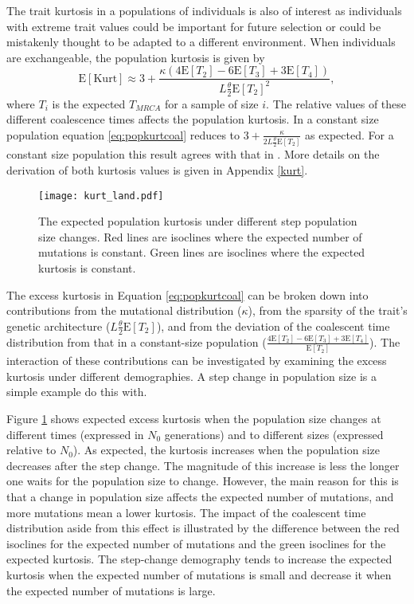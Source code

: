 \documentclass{article}
\newcommand{\T}{\frac{\theta}{2}}
\newcommand{\E}{\mathrm{E}}
\begin{document}
The trait kurtosis in a populations of individuals is also of interest as
individuals with extreme trait values could be important for future selection or
could be mistakenly thought to be adapted to a different environment. When
individuals are exchangeable, the population kurtosis is given by
\begin{equation}
  \label{eq:popkurtcoal}
  \E[\mbox{Kurt}] \approx 3 + \frac{\kappa( 4\E[T_2] - 6\E[T_3] + 
    3\E[T_4])}{L \T \E[T_2]^2},
\end{equation}
where $T_i$ is the expected $T_{MRCA}$ for a sample of size $i$. The relative
values of these different coalescence times affects the population kurtosis. In
a constant size population equation \eqref{eq:popkurtcoal} reduces to $3 +
\frac{\kappa}{2L\T \E[T_2]}$ as expected. For a constant size population this
result agrees with that in \citet{Schraiber2015}. More details on the derivation
of both kurtosis values is given in Appendix \ref{kurt}.

\begin{figure}
  \centering
  \texttt{[image: kurt\_land.pdf]}
  \caption{\footnotesize The expected population kurtosis under different step
    population size changes. Red lines are isoclines where the expected number
    of mutations is constant. Green lines are isoclines where the expected
    kurtosis is constant.}
  \label{fig:kurtscape}
\end{figure}

The excess kurtosis in Equation \ref{eq:popkurtcoal} can be broken down into
contributions from the mutational distribution ($\kappa$), from the sparsity of
the trait's genetic architecture ($L \T \E[T_2]$), and from the deviation of
the coalescent time distribution from that in a constant-size population
($\frac{ 4\E[T_2] - 6\E[T_3] + 3\E[T_4] }{ \E[T_2] }$). The interaction of these
contributions can be investigated by examining the excess kurtosis under
different demographies. A step change in population size is a simple example do
this with.

Figure \ref{fig:kurtscape} shows expected excess kurtosis when the population
size changes at different times (expressed in $N_0$ generations) and to
different sizes (expressed relative to $N_0$). As expected, the kurtosis
increases when the population size decreases after the step change. The
magnitude of this increase is less the longer one waits for the population size
to change. However, the main reason for this is that a change in population size
affects the expected number of mutations, and more mutations mean a lower
kurtosis. The impact of the coalescent time distribution aside from this effect
is illustrated by the difference between the red isoclines for the expected
number of mutations and the green isoclines for the expected kurtosis. The
step-change demography tends to increase the expected kurtosis when the expected
number of mutations is small and decrease it when the expected number of
mutations is large.
\end{document}
